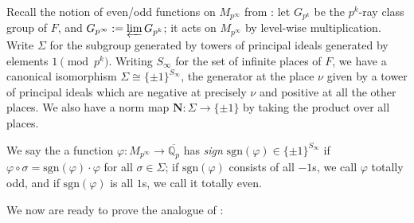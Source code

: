 \documentclass[10pt]{amsart}
\theoremstyle{definition}
\newcommand{\Q}{\mathbb{Q}}
\newcommand{\sgn}{\mathrm{sgn}}
\numberwithin{equation}{section}
\begin{document}
    Recall the notion of even/odd functions on $M_{p^\infty}$ from \cite[2.24]{DR}: let $G_{p^k}$ be the $p^k$-ray class group of $F$, and $G_{p^\infty}:=\varprojlim G_{p^k}$; it acts on $M_{p^\infty}$ by level-wise multiplication. Write $\Sigma$ for the subgroup generated by towers of principal ideals generated by elements $1\pmod{p^k}$. Writing $S_\infty$ for the set of infinite places of $F$, we have a canonical isomorphism $\Sigma \cong \{\pm 1\}^{S_\infty}$, the generator at the place $\nu$ given by a tower of principal ideals which are negative at precisely $\nu$ and positive at all the other places. We also have a norm map $\mathbf{N}:\Sigma\to \{\pm 1\}$ by taking the product over all places.
    
    We say the a function $\varphi:M_{p^\infty} \to \overline{\Q_p}$ has \emph{sign} $\sgn(\varphi)\in \{\pm 1\}^{S_\infty}$ if $\varphi \circ \sigma = \sgn(\varphi)\cdot \varphi$ for all $\sigma\in \Sigma$; if $\sgn(\varphi)$ consists of all $-1$s, we call $\varphi$ totally odd, and if $\sgn(\varphi)$ is all $1$s, we call it totally even.

    We now are ready to prove the analogue of \cite[(8.11--12)]{DR}:
\end{document}
